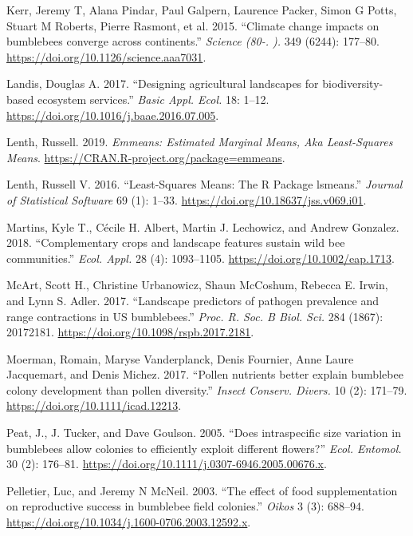 \documentclass[11pt,]{article}
\begin{document}
\leavevmode\hypertarget{ref-Kerr2015}{}%
Kerr, Jeremy T, Alana Pindar, Paul Galpern, Laurence Packer, Simon G
Potts, Stuart M Roberts, Pierre Rasmont, et al. 2015. ``Climate change
impacts on bumblebees converge across continents.'' \emph{Science (80-.
).} 349 (6244): 177--80. \url{https://doi.org/10.1126/science.aaa7031}.

\leavevmode\hypertarget{ref-Landis2017}{}%
Landis, Douglas A. 2017. ``Designing agricultural landscapes for
biodiversity-based ecosystem services.'' \emph{Basic Appl. Ecol.} 18:
1--12. \url{https://doi.org/10.1016/j.baae.2016.07.005}.

\leavevmode\hypertarget{ref-emmeans}{}%
Lenth, Russell. 2019. \emph{Emmeans: Estimated Marginal Means, Aka
Least-Squares Means}. \url{https://CRAN.R-project.org/package=emmeans}.

\leavevmode\hypertarget{ref-lsmeans}{}%
Lenth, Russell V. 2016. ``Least-Squares Means: The R Package lsmeans.''
\emph{Journal of Statistical Software} 69 (1): 1--33.
\url{https://doi.org/10.18637/jss.v069.i01}.

\leavevmode\hypertarget{ref-Martins2018}{}%
Martins, Kyle T., Cécile H. Albert, Martin J. Lechowicz, and Andrew
Gonzalez. 2018. ``Complementary crops and landscape features sustain
wild bee communities.'' \emph{Ecol. Appl.} 28 (4): 1093--1105.
\url{https://doi.org/10.1002/eap.1713}.

\leavevmode\hypertarget{ref-McArt2017}{}%
McArt, Scott H., Christine Urbanowicz, Shaun McCoshum, Rebecca E. Irwin,
and Lynn S. Adler. 2017. ``Landscape predictors of pathogen prevalence
and range contractions in US bumblebees.'' \emph{Proc. R. Soc. B Biol.
Sci.} 284 (1867): 20172181.
\url{https://doi.org/10.1098/rspb.2017.2181}.

\leavevmode\hypertarget{ref-Moerman2017}{}%
Moerman, Romain, Maryse Vanderplanck, Denis Fournier, Anne Laure
Jacquemart, and Denis Michez. 2017. ``Pollen nutrients better explain
bumblebee colony development than pollen diversity.'' \emph{Insect
Conserv. Divers.} 10 (2): 171--79.
\url{https://doi.org/10.1111/icad.12213}.

\leavevmode\hypertarget{ref-Peat2005}{}%
Peat, J., J. Tucker, and Dave Goulson. 2005. ``Does intraspecific size
variation in bumblebees allow colonies to efficiently exploit different
flowers?'' \emph{Ecol. Entomol.} 30 (2): 176--81.
\url{https://doi.org/10.1111/j.0307-6946.2005.00676.x}.

\leavevmode\hypertarget{ref-Pelletier2003}{}%
Pelletier, Luc, and Jeremy N McNeil. 2003. ``The effect of food
supplementation on reproductive success in bumblebee field colonies.''
\emph{Oikos} 3 (3): 688--94.
\url{https://doi.org/10.1034/j.1600-0706.2003.12592.x}.
\end{document}
